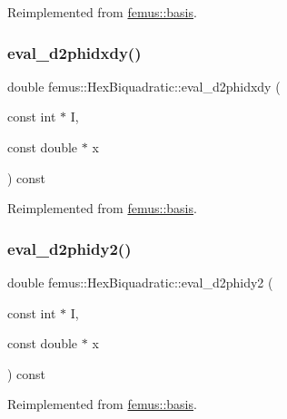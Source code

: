 Reimplemented from \mbox{\hyperlink{classfemus_1_1basis_a0a9839e75d1c9c8302486fc072eed028}{femus\+::basis}}.

\mbox{\label{classfemus_1_1_hex_biquadratic_ac95c76060992afc10491cfe13df048d5}} 
\subsubsection{\texorpdfstring{eval\+\_\+d2phidxdy()}{eval\_d2phidxdy()}}
{\footnotesize\ttfamily double femus\+::\+Hex\+Biquadratic\+::eval\+\_\+d2phidxdy (\begin{DoxyParamCaption}\item[{const int $\ast$}]{I,  }\item[{const double $\ast$}]{x }\end{DoxyParamCaption}) const\hspace{0.3cm}{\ttfamily [virtual]}}



Reimplemented from \mbox{\hyperlink{classfemus_1_1basis_ac9feaf9e60421143db2a3708f3c7fa48}{femus\+::basis}}.

\mbox{\label{classfemus_1_1_hex_biquadratic_a474b484fb23845775c3a5ec26b829784}} 
\subsubsection{\texorpdfstring{eval\+\_\+d2phidy2()}{eval\_d2phidy2()}}
{\footnotesize\ttfamily double femus\+::\+Hex\+Biquadratic\+::eval\+\_\+d2phidy2 (\begin{DoxyParamCaption}\item[{const int $\ast$}]{I,  }\item[{const double $\ast$}]{x }\end{DoxyParamCaption}) const\hspace{0.3cm}{\ttfamily [virtual]}}



Reimplemented from \mbox{\hyperlink{classfemus_1_1basis_a0febb29fe4b32213ff8d6d428f7241cd}{femus\+::basis}}.

